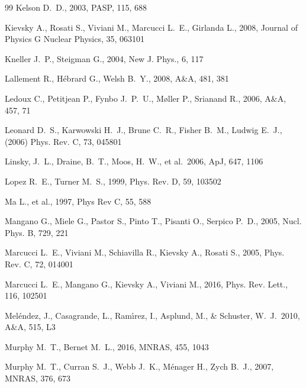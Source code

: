 \documentclass[12pt,preprint,useAMS,usenatbib]{emulateapj}
\begin{document}
\begin{thebibliography}{99}
Kelson D.~D., 2003, PASP, 115, 688

Kievsky A., Rosati S., Viviani M., Marcucci L.~E., Girlanda L., 2008, Journal of Physics G Nuclear Physics, 35, 063101

Kneller J.~P., Steigman G., 2004, New J. Phys., 6, 117

Lallement R., H{\'e}brard G., Welsh B.~Y., 2008, A\&A, 481, 381

Ledoux C., Petitjean P., Fynbo J.~P.~U., M{\o}ller P., Srianand R., 2006, A\&A, 457, 71

Leonard D.~S., Karwowski H.~J., Brune C.~R., Fisher B.~M., Ludwig E.~J., (2006) Phys. Rev. C, 73, 045801

Linsky, J.~L., Draine, B.~T., Moos, H.~W., et al.\ 2006, ApJ, 647, 1106

Lopez R.~E., Turner M.~S., 1999, Phys. Rev. D, 59, 103502

Ma L., et al., 1997, Phys Rev C, 55, 588

Mangano G., Miele G., Pastor S., Pinto T., Pisanti O., Serpico P.~D., 2005, Nucl. Phys. B, 729, 221
  
Marcucci L.~E., Viviani M., Schiavilla R., Kievsky A., Rosati S., 2005, Phys. Rev. C, 72, 014001

Marcucci L.~E., Mangano G., Kievsky A., Viviani M., 2016, Phys. Rev. Lett., 116, 102501

Mel{\'e}ndez, J., Casagrande, L., Ram{\'{\i}}rez, I., Asplund, M., \& Schuster, W.~J.\ 2010, A\&A, 515, L3

Murphy M.~T., Bernet M.~L., 2016, MNRAS, 455, 1043

Murphy M.~T., Curran S.~J., Webb J.~K., M{\'e}nager H., Zych B.~J., 2007, MNRAS, 376, 673


\end{thebibliography}
\end{document}
